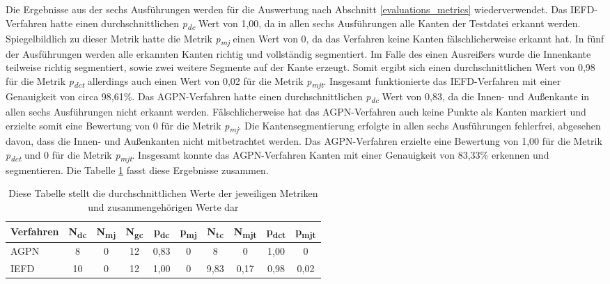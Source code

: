 Die Ergebnisse aus der sechs Ausführungen werden für die Auswertung nach Abschnitt \ref{evaluations_metrics} wiederverwendet. Das IEFD-Verfahren hatte einen durchschnittlichen \textit{p\textsubscript{dc}} Wert von 1,00, da in allen sechs Ausführungen alle Kanten der Testdatei erkannt werden. Spiegelbildlich zu dieser Metrik hatte die Metrik \textit{p\textsubscript{mj}} einen Wert von 0, da das Verfahren keine Kanten fälschlicherweise erkannt hat. In fünf der Ausführungen werden alle erkannten Kanten richtig und vollständig segmentiert. Im Falle des einen Ausreißers wurde die Innenkante teilweise richtig segmentiert, sowie zwei weitere Segmente auf der Kante erzeugt. Somit ergibt sich einen durchschnittlichen Wert von 0,98 für die Metrik \textit{p\textsubscript{dct}} allerdings auch einen Wert von 0,02 für die Metrik \textit{p\textsubscript{mjt}}. Insgesamt funktionierte das IEFD-Verfahren mit einer Genauigkeit von circa 98,61\%. Das AGPN-Verfahren hatte einen durchschnittlichen \textit{p\textsubscript{dc}} Wert von 0,83, da die Innen- und Außenkante in allen sechs Ausführungen nicht erkannt werden. Fälschlicherweise hat das AGPN-Verfahren auch keine Punkte als Kanten markiert und erzielte somit eine Bewertung von 0 für die Metrik \textit{p\textsubscript{mj}}. Die Kantensegmentierung erfolgte in allen sechs Ausführungen fehlerfrei, abgesehen davon, dass die Innen- und Außenkanten nicht mitbetrachtet werden. Das AGPN-Verfahren erzielte eine Bewertung von 1,00 für die Metrik \textit{p\textsubscript{dct}} und 0 für die Metrik \textit{p\textsubscript{mjt}}. Insgesamt konnte das AGPN-Verfahren Kanten mit einer Genauigkeit von 83,33\% erkennen und segmentieren. Die Tabelle \ref{table: metric_values} fasst diese Ergebnisse zusammen.

\begin{table}[h]
	\centering
	\begin{tabular}{l *{9}{c}}
		\hline
		\textbf{Verfahren} & \textbf{N\textsubscript{dc}} & \textbf{N\textsubscript{mj}} & \textbf{N\textsubscript{gc}} & \textbf{p\textsubscript{dc}} & \textbf{p\textsubscript{mj}} & \textbf{N\textsubscript{tc}} & \textbf{N\textsubscript{mjt}} & \textbf{p\textsubscript{dct}} & \textbf{p\textsubscript{mjt}} \\
		\hline
		AGPN & 8 & 0 & 12 & 0,83 & 0 & 8 & 0 & 1,00 & 0 \\
		IEFD & 10 & 0 & 12 & 1,00 & 0 & 9,83 & 0,17 & 0,98 & 0,02 \\
		\hline
	\end{tabular}
	\caption{Diese Tabelle stellt die durchschnittlichen Werte der jeweiligen Metriken und zusammengehörigen Werte dar}
	\label{table: metric_values}
\end{table}

